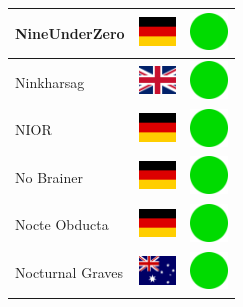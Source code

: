 \documentclass[12pt, a4paper, twoside]{report}
\begin{document}
\begin{center}
\begin{longtable}{|p{5cm}|p{2cm}|p{2cm}|}
 NineUnderZero                                              & \includegraphics[width=1cm]{../img/flags/de} &   \includegraphics[width=1cm]{../likes/y} \\ \hline
 Ninkharsag                                                 & \includegraphics[width=1cm]{../img/flags/gb} &   \includegraphics[width=1cm]{../likes/y} \\ \hline
 NIOR                                                       & \includegraphics[width=1cm]{../img/flags/de} &   \includegraphics[width=1cm]{../likes/y} \\ \hline
 No Brainer                                                 & \includegraphics[width=1cm]{../img/flags/de} &   \includegraphics[width=1cm]{../likes/y} \\ \hline
 Nocte Obducta                                              & \includegraphics[width=1cm]{../img/flags/de} &   \includegraphics[width=1cm]{../likes/y} \\ \hline
 Nocturnal Graves                                           & \includegraphics[width=1cm]{../img/flags/au} &   \includegraphics[width=1cm]{../likes/y} \\ \hline

\end{longtable}
\end{center}
\end{document}
